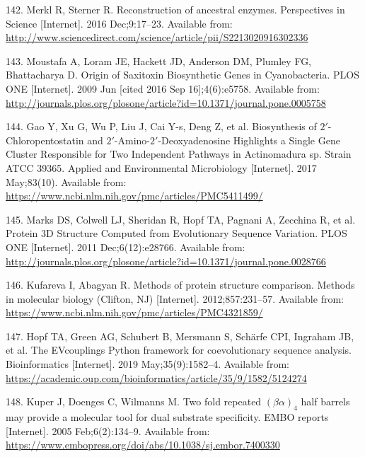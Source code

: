\documentclass[12pt,twoside]{reedthesis}
\begin{document}
  \hypertarget{ref-merkl_reconstruction_2016}{}
  142. Merkl R, Sterner R. Reconstruction of ancestral enzymes.
  Perspectives in Science {[}Internet{]}. 2016 Dec;9:17--23. Available
  from:
  \url{http://www.sciencedirect.com/science/article/pii/S2213020916302336}
  
  \hypertarget{ref-moustafa_origin_2009}{}
  143. Moustafa A, Loram JE, Hackett JD, Anderson DM, Plumley FG,
  Bhattacharya D. Origin of Saxitoxin Biosynthetic Genes in Cyanobacteria.
  PLOS ONE {[}Internet{]}. 2009 Jun {[}cited 2016 Sep 16{]};4(6):e5758.
  Available from:
  \url{http://journals.plos.org/plosone/article?id=10.1371/journal.pone.0005758}
  
  \hypertarget{ref-gao_biosynthesis_2017}{}
  144. Gao Y, Xu G, Wu P, Liu J, Cai Y-s, Deng Z, et al. Biosynthesis of
  \(2\prime\)-Chloropentostatin and
  \(2\prime\)-Amino-\(2\prime\)-Deoxyadenosine Highlights a Single Gene
  Cluster Responsible for Two Independent Pathways in Actinomadura sp.
  Strain ATCC 39365. Applied and Environmental Microbiology
  {[}Internet{]}. 2017 May;83(10). Available from:
  \url{https://www.ncbi.nlm.nih.gov/pmc/articles/PMC5411499/}
  
  \hypertarget{ref-marks_protein_2011}{}
  145. Marks DS, Colwell LJ, Sheridan R, Hopf TA, Pagnani A, Zecchina R,
  et al. Protein 3D Structure Computed from Evolutionary Sequence
  Variation. PLOS ONE {[}Internet{]}. 2011 Dec;6(12):e28766. Available
  from:
  \url{http://journals.plos.org/plosone/article?id=10.1371/journal.pone.0028766}
  
  \hypertarget{ref-kufareva_methods_2012}{}
  146. Kufareva I, Abagyan R. Methods of protein structure comparison.
  Methods in molecular biology (Clifton, NJ) {[}Internet{]}.
  2012;857:231--57. Available from:
  \url{https://www.ncbi.nlm.nih.gov/pmc/articles/PMC4321859/}
  
  \hypertarget{ref-hopf_evcouplings_2019}{}
  147. Hopf TA, Green AG, Schubert B, Mersmann S, Schärfe CPI, Ingraham
  JB, et al. The EVcouplings Python framework for coevolutionary sequence
  analysis. Bioinformatics {[}Internet{]}. 2019 May;35(9):1582--4.
  Available from:
  \url{https://academic.oup.com/bioinformatics/article/35/9/1582/5124274}
  
  \hypertarget{ref-kuper_twofold_2005}{}
  148. Kuper J, Doenges C, Wilmanns M. Two fold repeated
  \((\beta\alpha)_4\) half barrels may provide a molecular tool for dual
  substrate specificity. EMBO reports {[}Internet{]}. 2005
  Feb;6(2):134--9. Available from:
  \url{https://www.embopress.org/doi/abs/10.1038/sj.embor.7400330}
  
\end{document}
